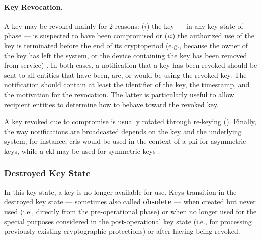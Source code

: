 \paragraph*{Key Revocation.} A key may be revoked mainly for 2 reasons: ($i$) the key --- in any key state of phase --- is suspected to have been compromised or ($ii$) the authorized use of the key is terminated before the end of its cryptoperiod (e.g., because the owner of the key has left the system, or the device containing the key has been removed from service) \cite{barker_recommendation_2020_p1}. In both cases, a notification that a key has been revoked should be sent to all entities that have been, are, or would be using the revoked key. The notification should contain at least the identifier of the key, the timestamp, and the motivation for the revocation. The latter is particularly useful to allow recipient entities to determine how to behave toward the revoked key. 


A key revoked due to compromise is usually rotated through re-keying (). Finally, the way notifications are broadcasted depends on the key and the underlying system; for instance, \glspl{crl} would be used in the context of a \gls{pki} for asymmetric keys, while a \gls{ckl} may be used for symmetric keys \cite{barker_recommendation_2015}.


\subsubsection{Destroyed Key State}\label{sec:key_management:lifecycle:destroyed}

In this key state, a key is no longer available for use. Keys transition in the destroyed key state --- sometimes also called \textbf{obsolete} --- when created but never used (i.e., directly from the pre-operational phase) or when no longer used for the special purposes considered in the post-operational key state (i.e., for processing previously existing cryptographic protections) or after having being revoked.

